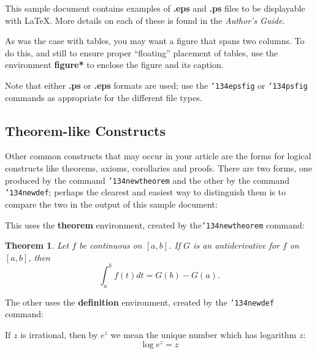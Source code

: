\documentclass{acm_proc_article-sp}
\begin{document}
This sample document contains examples of \textbf{.eps}
and \textbf{.ps} files to be displayable with \LaTeX.  More
details on each of these is found in the \textit{Author's Guide}.

%
%


As was the case with tables, you may want a figure
that spans two columns.  To do this, and still to
ensure proper ``floating'' placement of tables, use the environment
\textbf{figure*} to enclose the figure and its caption.

Note that either {\textbf{.ps}} or {\textbf{.eps}} formats are
used; use
the \texttt{{\char'134}epsfig} or \texttt{{\char'134}psfig}
commands as appropriate for the different file types.

\subsection{Theorem-like Constructs}
Other common constructs that may occur in your article are
the forms for logical constructs like theorems, axioms,
corollaries and proofs.  There are
two forms, one produced by the
command \texttt{{\char'134}newtheorem} and the
other by the command \texttt{{\char'134}newdef}; perhaps
the clearest and easiest way to distinguish them is
to compare the two in the output of this sample document:

This uses the \textbf{theorem} environment, created by
the\linebreak\texttt{{\char'134}newtheorem} command:
\newtheorem{theorem}{Theorem}
\begin{theorem}
Let $f$ be continuous on $[a,b]$.  If $G$ is
an antiderivative for $f$ on $[a,b]$, then
\begin{displaymath}\int^b_af(t)dt = G(b) - G(a).\end{displaymath}
\end{theorem}

The other uses the \textbf{definition} environment, created
by the \texttt{{\char'134}newdef} command:
\begin{definition}
If $z$ is irrational, then by $e^z$ we mean the
unique number which has
logarithm $z$: \begin{displaymath}{\log e^z = z}\end{displaymath}
\end{definition}
\end{document}
